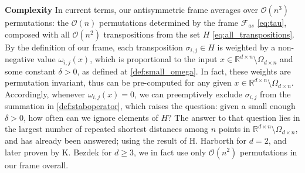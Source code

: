 \documentclass{amsart}
\newcommand{\nd}[1]{\todo[inline,color=red!35]{ND: #1}}
\theoremstyle{plain}
\theoremstyle{definition}
\theoremstyle{remark}
\newtheorem*{remark}{Remark}
\newcommand{\RR}{\mathbb{R}}
\begin{document}
\textbf{Complexity} In current terms, our antisymmetric frame averages over $\mathcal{O}(n^3)$ permutations: the $\mathcal{O}(n)$ permutations determined by the frame $\mathcal{F}_{as}$ \eqref{eq:tau}, composed with all $\mathcal{O}(n^2)$ transpositions from the set $H$ \eqref{eq:all_transpositions}. By the definition of our frame, each transposition $\sigma_{i,j}\in H$ is weighted by a non-negative value $\omega_{i, j}(x)$, which is proportional to the input $x \in \RR^{d \times n} \setminus \Omega_{d \times n}$ and some constant $\delta > 0$, as defined at \eqref{def:small_omega}. In fact, these weights are permutation invariant, thus can be pre-computed for any given $x \in \RR^{d \times n} \setminus \Omega_{d \times n}$. Accordingly, whenever $\omega_{i, j}(x) = 0$, we can preemptively exclude $\sigma_{i, j}$ from the summation in \eqref{def:staboperator}, which raises the question: given a small enough $\delta > 0$, how often can we ignore elements of $H$? The answer to that question lies in the largest number of repeated shortest distances
among $n$ points in $\RR^{d \times n} \setminus \Omega_{d \times n}$, and has already been answered; using the result of H. Harborth \cite{Harborth} for $d=2$, and later proven by K. Bezdek \cite{BEZDEK2002192} for $d\geq 3$, we in fact use only $\mathcal{O}(n^2)$ permutations in our frame overall. 

\end{document}
